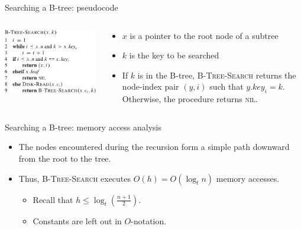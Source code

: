 \documentclass[11pt,t]{beamer}
\begin{document}
	\begin{frame}{Searching a B-tree: pseudocode}
		\vspace{0.5cm}
		\begin{columns}[c]
			\begin{column}[c]{.5\textwidth}
				\includegraphics[width=.9\columnwidth]{images/search}
			\end{column}
			\begin{column}[c]{.5\textwidth}
				\pause\begin{itemize}[<+->]
					\item \(x\) is a pointer to the root node of a subtree
					\item \(k\) is the key to be searched
					\item If \(k\) is in the B-tree, \textsc{B-Tree-Search} returns the node-index pair \((y,i)\) such that \(y.key_i=k\). Otherwise, the procedure returns \textsc{nil}.
				\end{itemize}
			\end{column}
		\end{columns}
	\end{frame}

	\begin{frame}{Searching a B-tree: memory access analysis}
		\begin{itemize}[<+->]
			\item The nodes encountered during the recursion form a simple path downward from the root to the tree.
			\item Thus, \textsc{B-Tree-Search} executes \(O(h) = O(\log_t n)\) memory accesses.
			\begin{itemize}[<+->]
				\item Recall that \(h \leq \log_t\left( \frac{n+1}{2}\right) \).
				\item Constants are left out in \(O\)-notation.
			\end{itemize}
		\end{itemize}
	\end{frame}
\end{document}
